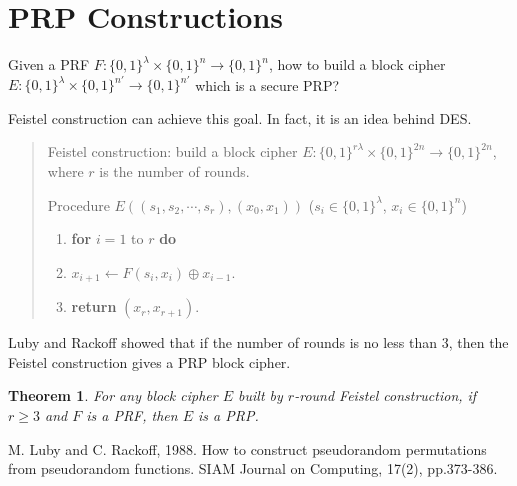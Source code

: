\documentclass[12pt]{article}
\newcommand{\bits}{\{0,1\}}
\newcommand{\tab}{\hspace{0.3in}}
\newtheorem{theorem}{Theorem}[section]
\theoremstyle{definition}
\begin{document}
\section{PRP Constructions}
Given a PRF $F : \bits^\lambda \times \bits^n \to \bits^n$, how to build a block cipher $E : \bits^\lambda \times \bits^{n'} \to \bits^{n'}$ which is a secure PRP?

Feistel construction can achieve this goal. In fact, it is an idea behind DES.

\begin{quote}
Feistel construction: build a block cipher $E : \bits^{r\lambda} \times \bits^{2n} \to \bits^{2n}$, where $r$ is the number of rounds.

Procedure $E((s_1, s_2, \cdots, s_r), (x_0, x_1))$ ($s_i\in\bits^\lambda$, $x_i\in\bits^n$)
\begin{enumerate}
\item {\bf for} $i=1$ to $r$ {\bf do}
\item \tab $x_{i+1} \gets F(s_i, x_i) \oplus x_{i-1}$.
\item {\bf return} $(x_r, x_{r+1})$.
\end{enumerate}
\end{quote}

Luby and Rackoff \cite{LR88} showed that if the number of rounds is no less than 3, then the Feistel construction gives a PRP block cipher.
\begin{theorem}
For any block cipher $E$ built by $r$-round Feistel construction, if $r\geq 3$ and $F$ is a PRF, then $E$ is a PRP.
\end{theorem}

\begin{thebibliography}{10}

M. Luby and C. Rackoff, 1988. 
How to construct pseudorandom permutations from pseudorandom functions. 
SIAM Journal on Computing, 17(2), pp.373-386.

\end{thebibliography}
\end{document}
